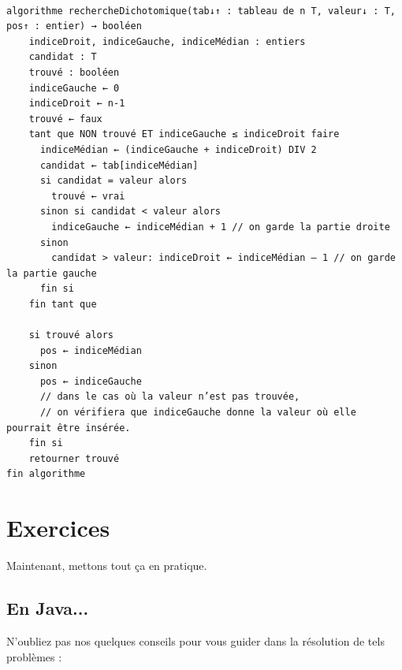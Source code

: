\documentclass[11pt,a4paper]{article}
\begin{document}
            \par
        \begin{verbatim}

algorithme rechercheDichotomique(tab↓↑ : tableau de n T, valeur↓ : T, pos↑ : entier) → booléen
    indiceDroit, indiceGauche, indiceMédian : entiers
    candidat : T
    trouvé : booléen
    indiceGauche ← 0
    indiceDroit ← n-1
    trouvé ← faux
    tant que NON trouvé ET indiceGauche ≤ indiceDroit faire
      indiceMédian ← (indiceGauche + indiceDroit) DIV 2
      candidat ← tab[indiceMédian]
      si candidat = valeur alors 
        trouvé ← vrai
      sinon si candidat < valeur alors
        indiceGauche ← indiceMédian + 1 // on garde la partie droite
      sinon 
        candidat > valeur: indiceDroit ← indiceMédian – 1 // on garde la partie gauche
      fin si
    fin tant que
    
    si trouvé alors
      pos ← indiceMédian
    sinon
      pos ← indiceGauche
      // dans le cas où la valeur n’est pas trouvée,
      // on vérifiera que indiceGauche donne la valeur où elle pourrait être insérée.
    fin si
    retourner trouvé
fin algorithme
\end{verbatim}\section{Exercices}
				Maintenant, mettons tout \c ca en pratique.
      
            \par
        \subsection{En Java...}
        N'oubliez pas nos quelques conseils pour vous guider dans la r\'esolution de tels probl\`emes :
        
\end{document}
